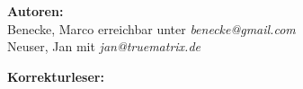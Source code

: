 \begin{titlepage}
{\vspace{2cm}

\textbf{Autoren:} \\
Benecke, Marco erreichbar unter \textit{benecke@gmail.com} \\
Neuser, Jan mit \textit{jan@truematrix.de} \\

\vspace{1cm}

\textbf{Korrekturleser:} \\
 \\
 \\
}

\lowertitleback{Dieses Buch unterliegt den Grundgedanken der GPL und wird ausschließich mit Hilfe des Satzsystems {\LaTeX} unter Linux geschrieben. Die Veröffentlichung erfolgt als plattformunabhägiges PDF. Vielen Dank.}

\maketitle

\end{titlepage}


